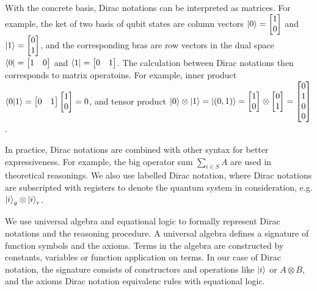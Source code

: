 \documentclass[runningheads]{llncs}
\begin{document}
With the concrete basis, Dirac notations can be interpreted as matrices. For example, the ket of two basis of qubit states are column vectors $\ket{0} = \begin{bmatrix} 1 \\ 0 \end{bmatrix}$ and $\ket{1} = \begin{bmatrix} 0 \\ 1 \end{bmatrix}$, and the corresponding bras are row vectors in the dual space $\bra{0} = \begin{bmatrix} 1 & 0 \end{bmatrix}$ and $\bra{1} = \begin{bmatrix} 0 & 1 \end{bmatrix}$.
The calculation between Dirac notations then corresponds to matrix operatoins. For example, inner product $\braket{0| 1} = \begin{bmatrix} 0 & 1 \end{bmatrix} \begin{bmatrix} 1 \\ 0 \end{bmatrix} = 0$, and tensor product $\ket{0} \otimes \ket{1} = \ket{(0, 1)} = \begin{bmatrix} 1 \\ 0 \end{bmatrix} \otimes \begin{bmatrix} 0 \\ 1 \end{bmatrix} = \begin{bmatrix} 0 \\ 1 \\ 0 \\ 0 \end{bmatrix}$.

In practice, Dirac notations are combined with other syntax for better expressiveness. For example, the big operator sum $\sum_{i \in S} A$ are used in theoretical reasonings. We also use labelled Dirac notation, where Dirac notations are subscripted with registers to denote the quantum system in consideration, e.g. $\ket{i}_q \otimes \ket{i}_r$.

We use universal algebra and equational logic to formally represent Dirac notations and the reasoning procedure.
A universal algebra defines a signature of function symbols and the axioms. Terms in the algebra are constructed by constants, variables or function application on terms. In our case of Dirac notation, the signature consists of constructors and operations like $\ket{i}$ or $A \otimes B$, and the axioms Dirac notation equivalenc rules with equational logic.
\end{document}
